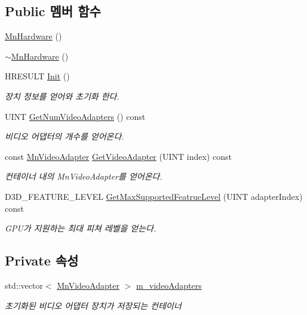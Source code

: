 \subsection*{Public 멤버 함수}
\begin{DoxyCompactItemize}
\item 
\hyperlink{class_m_n_l_1_1_mn_hardware_ad9270be0bcce91bf3a21b6cac432e713}{Mn\+Hardware} ()
\item 
\hyperlink{class_m_n_l_1_1_mn_hardware_a875d63cd3b81d293a3f38026816abb7e}{$\sim$\+Mn\+Hardware} ()
\item 
H\+R\+E\+S\+U\+LT \hyperlink{class_m_n_l_1_1_mn_hardware_a440da8664ff9470a3f5ef7f349a6d7f4}{Init} ()
\begin{DoxyCompactList}\small\item\em 장치 정보를 얻어와 초기화 한다. \end{DoxyCompactList}\item 
U\+I\+NT \hyperlink{class_m_n_l_1_1_mn_hardware_a4b614d4e29b4bd48f0d952f3ec707d12}{Get\+Num\+Video\+Adapters} () const
\begin{DoxyCompactList}\small\item\em 비디오 어댑터의 개수를 얻어온다. \end{DoxyCompactList}\item 
const \hyperlink{class_m_n_l_1_1_mn_video_adapter}{Mn\+Video\+Adapter} \hyperlink{class_m_n_l_1_1_mn_hardware_a84b1095acf9196e1bb0fe6a1f996b697}{Get\+Video\+Adapter} (U\+I\+NT index) const
\begin{DoxyCompactList}\small\item\em 컨테이너 내의 Mn\+Video\+Adapter를 얻어온다. \end{DoxyCompactList}\item 
D3\+D\+\_\+\+F\+E\+A\+T\+U\+R\+E\+\_\+\+L\+E\+V\+EL \hyperlink{class_m_n_l_1_1_mn_hardware_a8912748dc6e28ac992efb0282ee03ce5}{Get\+Max\+Supported\+Featrue\+Level} (U\+I\+NT adapter\+Index) const
\begin{DoxyCompactList}\small\item\em G\+P\+U가 지원하는 최대 피쳐 레벨을 얻는다. \end{DoxyCompactList}\end{DoxyCompactItemize}
\subsection*{Private 속성}
\begin{DoxyCompactItemize}
\item 
std\+::vector$<$ \hyperlink{class_m_n_l_1_1_mn_video_adapter}{Mn\+Video\+Adapter} $>$ \hyperlink{class_m_n_l_1_1_mn_hardware_a34ada79c31e979efd31bc7cee9c6e6e1}{m\+\_\+video\+Adapters}
\begin{DoxyCompactList}\small\item\em 초기화된 비디오 어댑터 장치가 저장되는 컨테이너 \end{DoxyCompactList}\end{DoxyCompactItemize}


